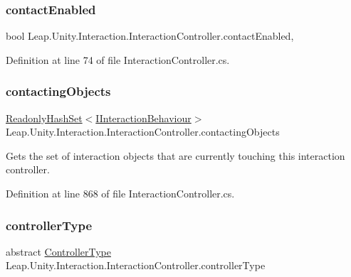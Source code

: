 \subsubsection{\texorpdfstring{contactEnabled}{contactEnabled}}
{\footnotesize\ttfamily bool Leap.\+Unity.\+Interaction.\+Interaction\+Controller.\+contact\+Enabled\hspace{0.3cm}{\ttfamily [get]}, {\ttfamily [set]}}



Definition at line 74 of file Interaction\+Controller.\+cs.

\mbox{\label{class_leap_1_1_unity_1_1_interaction_1_1_interaction_controller_aa6604231c26a97eeade073ea2dc60d21}} 
\subsubsection{\texorpdfstring{contactingObjects}{contactingObjects}}
{\footnotesize\ttfamily \mbox{\hyperlink{struct_leap_1_1_unity_1_1_readonly_hash_set}{Readonly\+Hash\+Set}}$<$\mbox{\hyperlink{interface_leap_1_1_unity_1_1_interaction_1_1_i_interaction_behaviour}{I\+Interaction\+Behaviour}}$>$ Leap.\+Unity.\+Interaction.\+Interaction\+Controller.\+contacting\+Objects\hspace{0.3cm}{\ttfamily [get]}}



Gets the set of interaction objects that are currently touching this interaction controller. 



Definition at line 868 of file Interaction\+Controller.\+cs.

\mbox{\label{class_leap_1_1_unity_1_1_interaction_1_1_interaction_controller_a92f1e18d2bbdd8b1e3eea0d3c98c0b9f}} 
\subsubsection{\texorpdfstring{controllerType}{controllerType}}
{\footnotesize\ttfamily abstract \mbox{\hyperlink{namespace_leap_1_1_unity_1_1_interaction_a9752eb3e2905e8ebd134fff20c155e6b}{Controller\+Type}} Leap.\+Unity.\+Interaction.\+Interaction\+Controller.\+controller\+Type\hspace{0.3cm}{\ttfamily [get]}}



